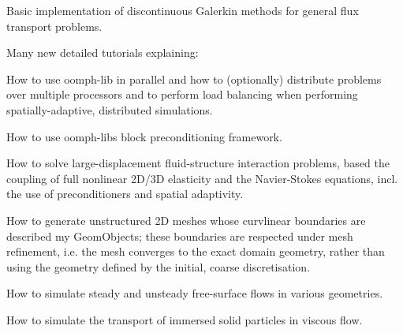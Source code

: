\begin{DoxyItemize}
\item Basic implementation of discontinuous Galerkin methods for general flux transport problems.~\newline
~\newline

\item Many new detailed tutorials explaining\+:~\newline
~\newline

\begin{DoxyItemize}
\item How to use  oomph-\/lib in parallel and how to (optionally) distribute problems over multiple processors and to perform load balancing when performing spatially-\/adaptive, distributed simulations. ~\newline
~\newline

\item How to use oomph-\/lib\textquotesingle{}s block preconditioning framework. ~\newline
~\newline

\item How to solve large-\/displacement fluid-\/structure interaction problems, based the coupling of full nonlinear 2\+D/3D elasticity and the Navier-\/\+Stokes equations, incl. the use of preconditioners and spatial adaptivity. ~\newline
~\newline

\item How to generate unstructured 2D meshes whose curvlinear boundaries are described my {\ttfamily Geom\+Objects}; these boundaries are respected under mesh refinement, i.\+e. the mesh converges to the exact domain geometry, rather than using the geometry defined by the initial, coarse discretisation. ~\newline
~\newline

\item How to simulate steady and unsteady free-\/surface flows in various geometries. ~\newline
~\newline

\item How to simulate the transport of immersed solid particles in viscous flow. ~\newline
~\newline


\end{DoxyItemize}
\end{DoxyItemize}

